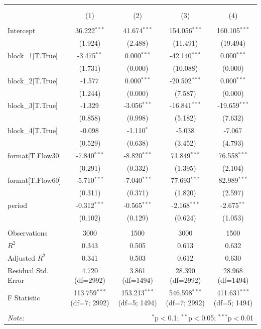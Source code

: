 \begin{table}[!htbp] \centering
\begin{tabular}{@{\extracolsep{5pt}}lcccc}
\\[-1.8ex]\hline
\hline \\[-1.8ex]
\\[-1.8ex] & (1) & (2) & (3) & (4) \\
\hline \\[-1.8ex]
 Intercept & 36.222$^{***}$ & 41.674$^{***}$ & 154.056$^{***}$ & 160.105$^{***}$ \\
& (1.924) & (2.488) & (11.491) & (19.494) \\
 block_1[T.True] & -3.475$^{**}$ & 0.000$^{***}$ & -42.140$^{***}$ & 0.000$^{***}$ \\
& (1.731) & (0.000) & (10.088) & (0.000) \\
 block_2[T.True] & -1.577$^{}$ & 0.000$^{***}$ & -20.502$^{***}$ & 0.000$^{***}$ \\
& (1.244) & (0.000) & (7.587) & (0.000) \\
 block_3[T.True] & -1.329$^{}$ & -3.056$^{***}$ & -16.841$^{***}$ & -19.659$^{***}$ \\
& (0.858) & (0.998) & (5.182) & (7.632) \\
 block_4[T.True] & -0.098$^{}$ & -1.110$^{*}$ & -5.038$^{}$ & -7.067$^{}$ \\
& (0.529) & (0.638) & (3.452) & (4.793) \\
 format[T.Flow30] & -7.840$^{***}$ & -8.820$^{***}$ & 71.849$^{***}$ & 76.558$^{***}$ \\
& (0.291) & (0.332) & (1.395) & (2.104) \\
 format[T.Flow60] & -5.710$^{***}$ & -7.040$^{***}$ & 77.693$^{***}$ & 82.989$^{***}$ \\
& (0.311) & (0.371) & (1.820) & (2.597) \\
 period & -0.312$^{***}$ & -0.565$^{***}$ & -2.168$^{***}$ & -2.675$^{**}$ \\
& (0.102) & (0.129) & (0.624) & (1.053) \\
\hline \\[-1.8ex]
 Observations & 3000 & 1500 & 3000 & 1500 \\
 $R^2$ & 0.343 & 0.505 & 0.613 & 0.632 \\
 Adjusted $R^2$ & 0.341 & 0.503 & 0.612 & 0.630 \\
 Residual Std. Error & 4.720 (df=2992) & 3.861 (df=1494) & 28.390 (df=2992) & 28.968 (df=1494) \\
 F Statistic & 113.759$^{***}$ (df=7; 2992) & 153.213$^{***}$ (df=5; 1494) & 546.598$^{***}$ (df=7; 2992) & 411.631$^{***}$ (df=5; 1494) \\
\hline
\hline \\[-1.8ex]
\textit{Note:} & \multicolumn{4}{r}{$^{*}$p$<$0.1; $^{**}$p$<$0.05; $^{***}$p$<$0.01} \\
\end{tabular}
\end{table}